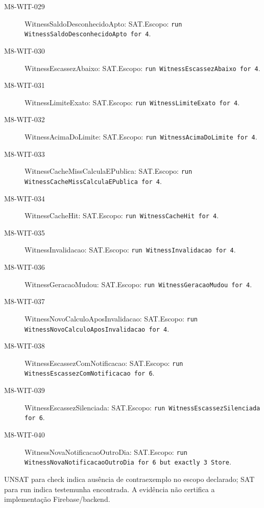 \begin{description}
\item[M8-WIT-029] WitnessSaldoDesconhecidoApto: SAT.\newline Escopo: \texttt{run WitnessSaldoDesconhecidoApto for 4}.
\item[M8-WIT-030] WitnessEscassezAbaixo: SAT.\newline Escopo: \texttt{run WitnessEscassezAbaixo for 4}.
\item[M8-WIT-031] WitnessLimiteExato: SAT.\newline Escopo: \texttt{run WitnessLimiteExato for 4}.
\item[M8-WIT-032] WitnessAcimaDoLimite: SAT.\newline Escopo: \texttt{run WitnessAcimaDoLimite for 4}.
\item[M8-WIT-033] WitnessCacheMissCalculaEPublica: SAT.\newline Escopo: \texttt{run WitnessCacheMissCalculaEPublica for 4}.
\item[M8-WIT-034] WitnessCacheHit: SAT.\newline Escopo: \texttt{run WitnessCacheHit for 4}.
\item[M8-WIT-035] WitnessInvalidacao: SAT.\newline Escopo: \texttt{run WitnessInvalidacao for 4}.
\item[M8-WIT-036] WitnessGeracaoMudou: SAT.\newline Escopo: \texttt{run WitnessGeracaoMudou for 4}.
\item[M8-WIT-037] WitnessNovoCalculoAposInvalidacao: SAT.\newline Escopo: \texttt{run WitnessNovoCalculoAposInvalidacao for 4}.
\item[M8-WIT-038] WitnessEscassezComNotificacao: SAT.\newline Escopo: \texttt{run WitnessEscassezComNotificacao for 6}.
\item[M8-WIT-039] WitnessEscassezSilenciada: SAT.\newline Escopo: \texttt{run WitnessEscassezSilenciada for 6}.
\item[M8-WIT-040] WitnessNovaNotificacaoOutroDia: SAT.\newline Escopo: \texttt{run WitnessNovaNotificacaoOutroDia for 6 but exactly 3 Store}.
\end{description}
UNSAT para check indica ausência de contraexemplo no escopo declarado; SAT para run indica testemunha encontrada. A evidência não certifica a implementação Firebase/backend.
